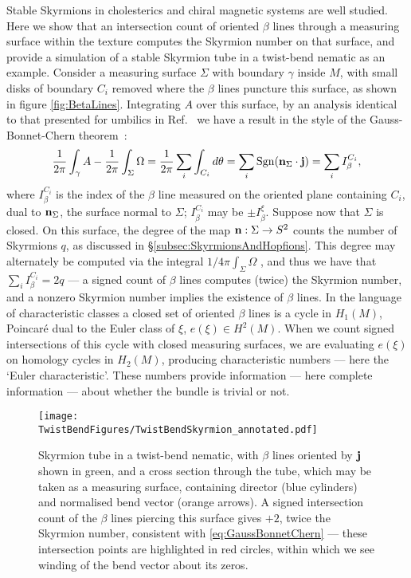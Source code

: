 {Stable Skyrmions in cholesterics \citep{Afghah2017} and chiral magnetic systems \citep{Yu2010} are well studied. Here we show that an intersection count of oriented $\beta$ lines through a measuring surface within the texture computes the Skyrmion number on that surface, and provide a simulation of a stable Skyrmion tube in a twist-bend nematic as an example. Consider a measuring surface $\Sigma$ with boundary $\gamma$ inside $M$, with small disks of boundary $C_i$ removed where the $\beta$ lines puncture this surface, as shown in figure \ref{fig:BetaLines}. Integrating $A$ over this surface, by an analysis identical to that presented for umbilics in Ref.~\citep{Machon2016b} we have a result in the style of the Gauss-Bonnet-Chern theorem~\citep{Lee1996,Frankel2015}:
\begin{equation}
    \frac{1}{2\pi}\int_\gamma A - \frac{1}{2\pi}\int_\Sigma \Omega = \frac{1}{2\pi}\sum_i \int_{C_i} d \theta = \sum_i \mathrm{Sgn}(\mathbf{n}_{\Sigma} \cdot \mathbf{j}) = \sum_i I_\beta^{C_i},
    \label{eq:GaussBonnetChern}
\end{equation}
where $I_\beta^{C_i}$ is the index of the $\beta$ line measured on the oriented plane containing $C_i$, dual to $\mathbf{n}_\Sigma$, the surface normal to $\Sigma$; $I_\beta^{C_i}$ may be $\pm I_\beta^\xi$. Suppose now that $\Sigma$ is closed. On this surface, the degree of the map $\mathbf{n} : \Sigma \rightarrow  S^2$ counts the number of Skyrmions $q$, as discussed in \S\ref{subsec:SkyrmionsAndHopfions}. This degree may alternately be computed via the integral $1/4\pi \int_\Sigma \Omega$ \citep{Frankel2015}, and thus we have that $\sum_i I_\beta^{C_i}=2q$ --- a signed count of $\beta$ lines computes (twice) the Skyrmion number, and a nonzero Skyrmion number implies the existence of $\beta$ lines. In the language of characteristic classes \citep{MilnorStasheffBook} a closed set of oriented $\beta$ lines is a cycle in $H_1(M)$, Poincar\'{e} dual to the Euler class of $\xi$, $e(\xi)\in H^2(M)$. When we count signed intersections of this cycle with closed measuring surfaces, we are evaluating $e(\xi)$ on homology cycles in $H_2(M)$, producing characteristic numbers --- here the `Euler characteristic'. These numbers provide information --- here complete information \citep{MilnorStasheffBook} --- about whether the bundle is trivial or not.
\begin{figure}[htbp]
    \centering
    \texttt{[image: \\TwistBendFigures/TwistBendSkyrmion\_annotated.pdf]}
    \caption[Skyrmion tube in a twist-bend nematic.]{Skyrmion tube in a twist-bend nematic, with $\beta$ lines oriented by $\mathbf{j}$ shown in green, and a cross section through the tube, which may be taken as a measuring surface, containing director (blue cylinders) and normalised bend vector (orange arrows). A signed intersection count of the $\beta$ lines piercing this surface gives $+2$, twice the Skyrmion number, consistent with \eqref{eq:GaussBonnetChern} --- these intersection points are highlighted in red circles, within which we see winding of the bend vector about its zeros.}
    \label{fig:TwistBendSkyrmion}
\end{figure}

}
